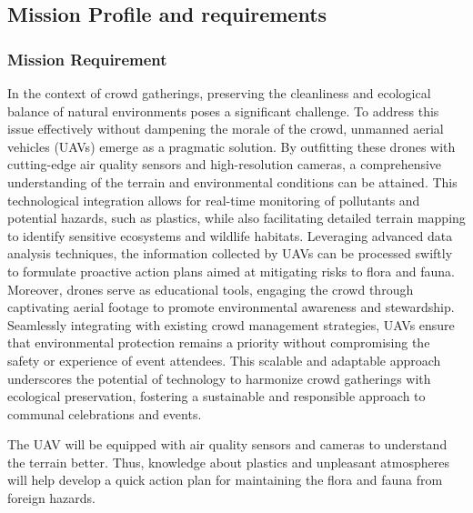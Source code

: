 \documentclass[12 pt]{article}
\begin{document}
\subsection{Mission Profile and requirements}

\subsubsection{Mission Requirement}
In the context of crowd gatherings, preserving the cleanliness and ecological balance of natural environments poses a significant challenge. To address this issue effectively without dampening the morale of the crowd, unmanned aerial vehicles (UAVs) emerge as a pragmatic solution. By outfitting these drones with cutting-edge air quality sensors and high-resolution cameras, a comprehensive understanding of the terrain and environmental conditions can be attained. This technological integration allows for real-time monitoring of pollutants and potential hazards, such as plastics, while also facilitating detailed terrain mapping to identify sensitive ecosystems and wildlife habitats. Leveraging advanced data analysis techniques, the information collected by UAVs can be processed swiftly to formulate proactive action plans aimed at mitigating risks to flora and fauna. Moreover, drones serve as educational tools, engaging the crowd through captivating aerial footage to promote environmental awareness and stewardship. Seamlessly integrating with existing crowd management strategies, UAVs ensure that environmental protection remains a priority without compromising the safety or experience of event attendees. This scalable and adaptable approach underscores the potential of technology to harmonize crowd gatherings with ecological preservation, fostering a sustainable and responsible approach to communal celebrations and events. 

The UAV will be equipped with air quality sensors and cameras to understand the terrain better. Thus, knowledge about plastics and unpleasant atmospheres will help develop a quick action plan for maintaining the flora and fauna from foreign hazards.
\end{document}

